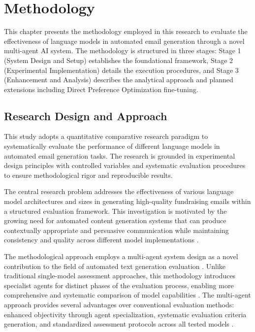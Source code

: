 \chapter{Methodology}

This chapter presents the methodology employed in this research to evaluate the effectiveness of language models in automated email generation through a novel multi-agent AI system. The methodology is structured in three stages: Stage 1 (System Design and Setup) establishes the foundational framework, Stage 2 (Experimental Implementation) details the execution procedures, and Stage 3 (Enhancement and Analysis) describes the analytical approach and planned extensions including Direct Preference Optimization fine-tuning.

\section{Research Design and Approach}
\label{sec:research-design}

This study adopts a quantitative comparative research paradigm to systematically evaluate the performance of different language models in automated email generation tasks. The research is grounded in experimental design principles with controlled variables and systematic evaluation procedures to ensure methodological rigor and reproducible results.

The central research problem addresses the effectiveness of various language model architectures and sizes in generating high-quality fundraising emails within a structured evaluation framework. This investigation is motivated by the growing need for automated content generation systems that can produce contextually appropriate and persuasive communication while maintaining consistency and quality across different model implementations \cite{murakami2023nlg_advertising, zheng2023click_controllable}.

The methodological approach employs a multi-agent system design as a novel contribution to the field of automated text generation evaluation \cite{guo2024llm_multiagent, yan2025beyond_selftalk}. Unlike traditional single-model assessment approaches, this methodology introduces specialist agents for distinct phases of the evaluation process, enabling more comprehensive and systematic comparison of model capabilities \cite{yehudai2025survey_llm_agents}. The multi-agent approach provides several advantages over conventional evaluation methods: enhanced objectivity through agent specialization, systematic evaluation criteria generation, and standardized assessment protocols across all tested models \cite{ma2024agentboard}.




